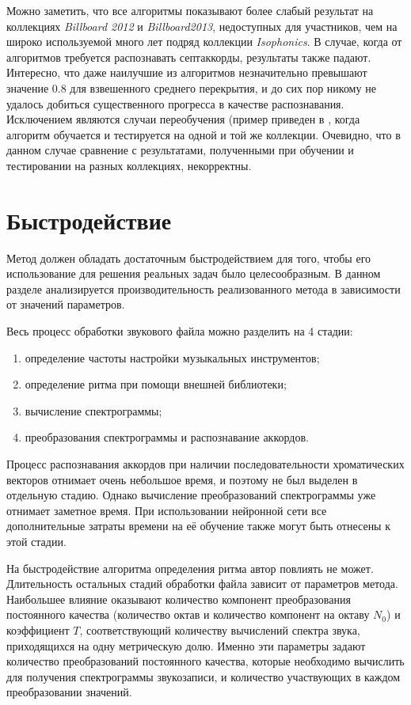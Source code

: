 Можно заметить, что все алгоритмы показывают более слабый результат на
коллекциях \emph{Billboard 2012} и \emph{Billboard2013}, недоступных для
участников, чем на широко используемой много лет подряд коллекции
\emph{Isophonics}. В случае, когда от алгоритмов требуется распознавать
септаккорды, результаты также падают. Интересно, что даже наилучшие из
алгоритмов незначительно превышают значение $0.8$ для взвешенного среднего
перекрытия, и до сих пор никому не удалось добиться существенного прогресса в
качестве распознавания. Исключением являются случаи переобучения (пример
приведен в \cite{BoulangerLewandowski2013}, когда алгоритм обучается и
тестируется на одной и той же коллекции. Очевидно, что в данном случае
сравнение с результатами, полученными при обучении и тестировании на разных
коллекциях, некорректны.

\section{Быстродействие} \label{sect3_time}

Метод должен обладать достаточным быстродействием для того, чтобы его
использование для решения реальных задач было целесообразным. В данном разделе
анализируется производительность реализованного метода в зависимости от значений
параметров.

Весь процесс обработки звукового файла можно разделить на 4 стадии:
\begin{enumerate}
  \item определение частоты настройки музыкальных инструментов;
  \item определение ритма при помощи внешней библиотеки;
  \item вычисление спектрограммы;
  \item преобразования спектрограммы и распознавание аккордов.
\end{enumerate}

Процесс распознавания аккордов при наличии последовательности хроматических
векторов отнимает очень небольшое время, и поэтому не был выделен в отдельную
стадию. Однако вычисление преобразований спектрограммы уже отнимает заметное
время. При использовании нейронной сети все дополнительные затраты времени на её
обучение также могут быть отнесены к этой стадии.

На быстродействие алгоритма определения ритма автор повлиять не может.
Длительность остальных стадий обработки файла зависит от параметров метода.
Наибольшее влияние оказывают количество компонент преобразования постоянного
качества (количество октав и количество компонент на октаву $N_0$) и
коэффициент $T$, соответствующий количеству вычислений спектра звука,
приходящихся на одну метрическую долю. Именно эти параметры задают количество
преобразований постоянного качества, которые необходимо вычислить для получения
спектрограммы звукозаписи, и количество участвующих в каждом преобразовании
значений.

